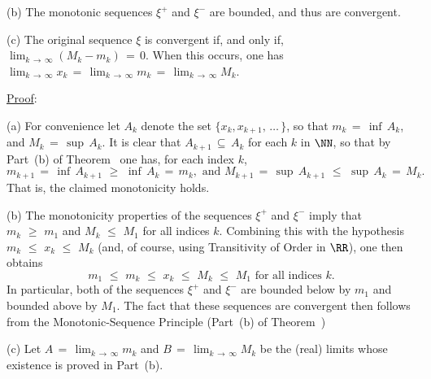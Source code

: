 {\V

        (b) The monotonic sequences ${\xi}^{+}$ and ${\xi}^{-}$ are bounded, and thus are convergent.

\V

        (c) The original sequence ${\xi}$ is convergent if, and only if, $\lim_{k \,{\rightarrow}\, {\infty}} (M_{k}-m_{k}) \,=\, 0$.
    When this occurs, one has $\lim_{k \,{\rightarrow}\, {\infty}} x_{k} \,=\, \lim_{k \,{\rightarrow}\, {\infty}} m_{k} \,=\, \lim_{k \,{\rightarrow}\, {\infty}} M_{k}$.

\V

         \underline{Proof}:

\V

        (a) For convenience let $A_{k}$ denote the set $\{x_{k},x_{k+1},\,{\ldots}\,\}$,
    so that $m_{k} \,=\, {\inf}\,A_{k}$, and $M_{k} \,=\, {\sup}\,A_{k}$.
    It is clear that $A_{k+1} \,{\subseteq}\, A_{k}$ for each $k$ in ${\NN}$, so that by Part~(b) of Theorem~ one has, for each index $k$,
        \begin{displaymath}
        m_{k+1} \,=\, {\inf}\,A_{k+1}\,\,{\geq}\,\,{\inf}\,A_{k} \,=\, m_{k},
    \mbox{ and } 
        M_{k+1} \,=\, {\sup}\,A_{k+1}\,\,{\leq}\,\,{\sup}\,A_{k} \,=\, M_{k}.
        \end{displaymath}
    That is, the claimed monotonicity holds.

\V

        (b) The monotonicity properties of the sequences ${\xi}^{+}$ and ${\xi}^{-}$ imply that $m_{k}\,\,{\geq}\,\,m_{1}$ and $M_{k}\,\,{\leq}\,\,M_{1}$ for all indices $k$.
    Combining this with the hypothesis $m_{k}\,\,{\leq}\,\,x_{k}\,\,{\leq}\,\,M_{k}$ (and, of course, using Transitivity of Order in ${\RR}$), one then obtains
        \begin{displaymath}
        m_{1}\,\,{\leq}\,\,m_{k}\,\,{\leq}\,\,x_{k}\,\,{\leq}\,\,M_{k}\,\,{\leq}\,\,M_{1} \mbox{ for all indices $k$}.
        \end{displaymath}
    In particular, both of the sequences ${\xi}^{+}$ and ${\xi}^{-}$ are bounded below by $m_{1}$ and bounded above by $M_{1}$.
    The fact that these sequences are convergent then follows from the Monotonic-Sequence Principle (Part~(b) of Theorem~)

\V

        (c) Let $A \,=\, \lim_{k \,{\rightarrow}\, {\infty}} m_{k}$ and $B \,=\, \lim_{k \,{\rightarrow}\, {\infty}} M_{k}$ be the (real) limits whose existence is proved in Part~(b).

}
